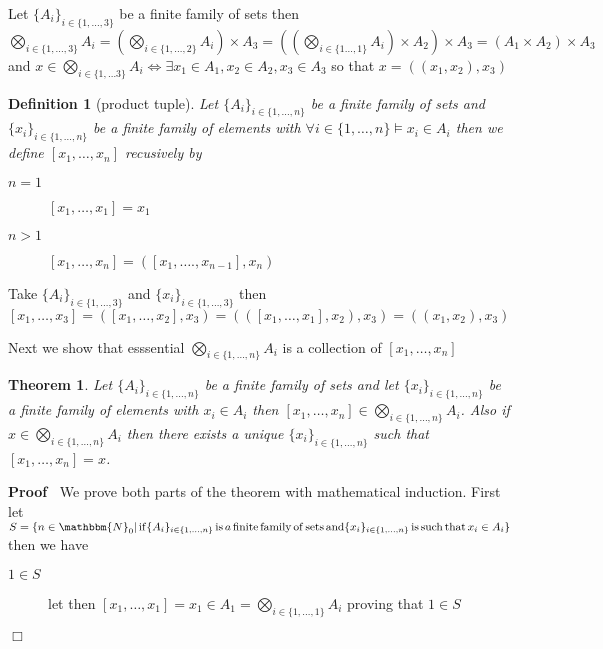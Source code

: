 \documentclass{book}
\newcommand{\tmop}[1]{\ensuremath{\operatorname{#1}}}
\newenvironment{proof}{\noindent\textbf{Proof\ }}{\hspace*{\fill}$\Box$\medskip}
\newtheorem{definition}{Definition}
{\theorembodyfont{\rmfamily}\newtheorem{example}{Example}}
\newtheorem{theorem}{Theorem}
\begin{document}
{{\begin{example}
  Let $\{ A_i \}_{i \in \{ 1, \ldots, 3 \}}$ be a finite family of sets then
  $\bigotimes_{i \in \{ 1, \ldots, 3 \}} A_i = \left( \bigotimes_{i \in \{ 1,
  \ldots, 2 \}} A_i \right) \times A_3 = \left( \left( \bigotimes_{i \in \{ 1
  \ldots, 1 \}} A_i \right) \times A_2 \right) \times A_3 = (A_1 \times A_2)
  \times A_3$ and $x \in \bigotimes_{i \in \{ 1, \ldots 3 \}} A_i
  \Leftrightarrow \exists x_1 \in A_1, x_2 \in A_2, x_3 \in A_3$ so that $x =
  ((x_1, x_2), x_3)$
\end{example}

\begin{definition}[product tuple]
  \label{product tuple}{}Let $\{ A_i \}_{i \in \{ 1,
  \ldots, n \}}$ be a finite family of sets and $\{ x_i \}_{i \in \{ 1,
  \ldots, n \}}$ be a finite family of elements with $\forall i \in \{ 1,
  \ldots, n \} \vDash x_i \in A_i$ then we define $[x_1, \ldots, x_n]$
  recusively by
  \begin{description}
    \item[$n = 1$] $[x_1, \ldots, x_1] = x_1$
    
    \item[$n > 1$] $[x_1, \ldots, x_n] = ([x_1, \ldots ., x_{n - 1}], x_n)$
  \end{description}
\end{definition}

\begin{example}
  Take $\{ A_i \}_{i \in \{ 1, \ldots, 3 \}}$ and $\{ x_i \}_{i \in \{ 1,
  \ldots, 3 \}}$ then $[x_1, \ldots, x_3] = ([x_1, \ldots, x_2], x_3) =
  (([x_1, \ldots, x_1], x_2), x_3) = ((x_1, x_2), x_3)$
\end{example}

Next we show that esssential $\bigotimes_{i \in \{ 1, \ldots, n \}} A_i$ is a
collection of $[x_1, \ldots, x_n]$

\begin{theorem}
  Let $\{ A_i \}_{i \in \{ 1, \ldots, n \}}$ be a finite family of sets and
  let $\{ x_i \}_{i \in \{ 1, \ldots, n \}}$ be a finite family of elements
  with $x_i \in A_i$ then $[x_1, \ldots, x_n] \in \bigotimes_{i \in \{ 1,
  \ldots, n \}} A_i$. Also if $x \in \bigotimes_{i \in \{ 1, \ldots, n \}}
  A_i$ then there exists a unique $\{ x_i \}_{i \in \{ 1, \ldots, n \}}$ such
  that $[x_1, \ldots, x_n] = x$.
\end{theorem}

\begin{proof}
  We prove both parts of the theorem with mathematical induction. First let $S
  = \{ n \in \mathbbm{N}_0 | \tmop{if} \{ A_i \}_{i \in \{ 1, \ldots, n \}}
  \tmop{is} a \tmop{finite} \tmop{family} \tmop{of} \tmop{sets} \tmop{and} \{
  x_i \}_{i \in \{ 1, \ldots, n \}} \tmop{is} \tmop{such} \tmop{that} x_i \in
  A_i  \}$ then we have
  \begin{description}
    \item[$1 \in S$] let then $[x_1, \ldots, x_1] = x_1 \in A_1 =
    \bigotimes_{i \in \{ 1, \ldots, 1 \}} A_i$ proving that $1 \in S$
    

\end{description}
\end{proof}}}
\end{document}
